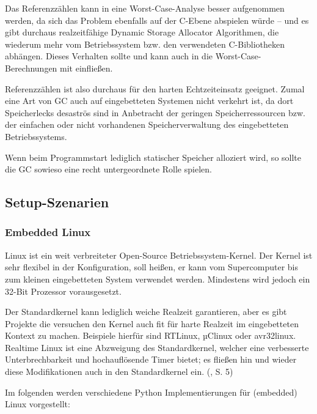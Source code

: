 Das Referenzzählen kann in eine Worst-Case-Analyse besser aufgenommen werden,
da sich das Problem ebenfalls auf der C-Ebene abspielen würde -- und es gibt
durchaus realzeitfähige Dynamic Storage Allocator Algorithmen, die wiederum
mehr vom Betriebssystem bzw. den verwendeten C-Bibliotheken abhängen. Dieses
Verhalten sollte und kann auch in die Worst-Case-Berechnungen mit einfließen.\cite{malloc}

Referenzzählen ist also durchaus für den harten Echtzeiteinsatz geeignet.
Zumal eine Art von GC auch auf eingebetteten Systemen nicht verkehrt ist, da
dort Speicherlecks desaströs sind in Anbetracht der geringen
Speicherressourcen bzw. der einfachen oder nicht vorhandenen
Speicherverwaltung des eingebetteten Betriebssystems.\cite{refcount}

Wenn beim Programmstart lediglich statischer Speicher alloziert wird, so
sollte die GC sowieso eine recht untergeordnete Rolle spielen.


\subsection{Setup-Szenarien}


\subsubsection{Embedded Linux}


Linux ist ein weit verbreiteter Open-Source Betriebssystem-Kernel. Der Kernel
ist sehr flexibel in der Konfiguration, soll heißen, er kann vom Supercomputer
bis zum kleinen eingebetteten System verwendet werden. Mindestens wird jedoch
ein 32-Bit Prozessor vorausgesetzt.

Der Standardkernel kann lediglich weiche Realzeit garantieren, aber es gibt
Projekte die versuchen den Kernel auch fit für harte Realzeit im eingebetteten
Kontext zu machen. Beispiele hierfür sind RTLinux, µClinux oder avr32linux.
Realtime Linux ist eine Abzweigung des Standardkernel, welcher eine
verbesserte Unterbrechbarkeit und hochauflösende Timer bietet; es fließen hin
und wieder diese Modifikationen auch in den Standardkernel ein. (\cite{dipl}, S. 5)

Im folgenden werden verschiedene Python Implementierungen für (embedded) Linux
vorgestellt:



